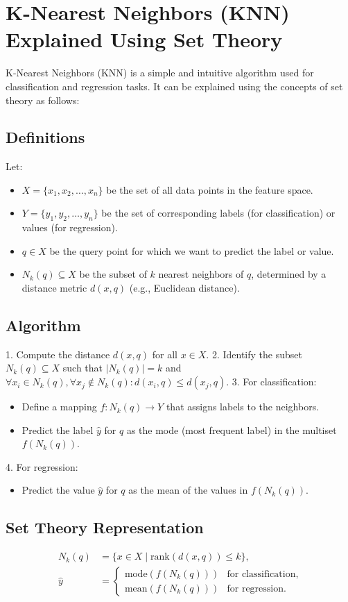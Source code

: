 \documentclass{article}
\begin{document}
\section*{K-Nearest Neighbors (KNN) Explained Using Set Theory}

K-Nearest Neighbors (KNN) is a simple and intuitive algorithm used for classification and regression tasks. It can be explained using the concepts of set theory as follows:












\subsection*{Definitions}
Let:
\begin{itemize}
    \item $X = \{x_1, x_2, \dots, x_n\}$ be the set of all data points in the feature space.
    \item $Y = \{y_1, y_2, \dots, y_n\}$ be the set of corresponding labels (for classification) or values (for regression).
    \item $q \in X$ be the query point for which we want to predict the label or value.
    \item $N_k(q) \subseteq X$ be the subset of $k$ nearest neighbors of $q$, determined by a distance metric $d(x, q)$ (e.g., Euclidean distance).
\end{itemize}

\subsection*{Algorithm}
1. Compute the distance $d(x, q)$ for all $x \in X$.
2. Identify the subset $N_k(q) \subseteq X$ such that $|N_k(q)| = k$ and $\forall x_i \in N_k(q), \forall x_j \notin N_k(q): d(x_i, q) \leq d(x_j, q)$.
3. For classification:
   \begin{itemize}
       \item Define a mapping $f: N_k(q) \to Y$ that assigns labels to the neighbors.
       \item Predict the label $\hat{y}$ for $q$ as the mode (most frequent label) in the multiset $f(N_k(q))$.
   \end{itemize}
4. For regression:
   \begin{itemize}
       \item Predict the value $\hat{y}$ for $q$ as the mean of the values in $f(N_k(q))$.
   \end{itemize}

\subsection*{Set Theory Representation}
\begin{align*}
N_k(q) &= \{x \in X \mid \text{rank}(d(x, q)) \leq k\}, \\
\hat{y} &= 
\begin{cases} 
\text{mode}(f(N_k(q))) & \text{for classification}, \\
\text{mean}(f(N_k(q))) & \text{for regression}.
\end{cases}
\end{align*}
\end{document}

